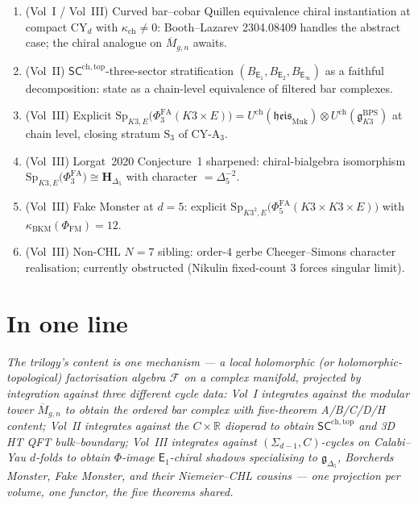 \documentclass[11pt]{article}
\theoremstyle{definition}
\theoremstyle{remark}
\providecommand{\R}{\mathbb{R}}
\providecommand{\cF}{\mathcal{F}}
\providecommand{\fg}{\mathfrak{g}}
\providecommand{\fheis}{\mathfrak{heis}}
\providecommand{\Sp}{\mathrm{Sp}}
\providecommand{\Phifa}{\Phi^{\mathrm{FA}}}
\providecommand{\Eone}{\mathsf{E}_1}
\providecommand{\Etwo}{\mathsf{E}_2}
\providecommand{\Einf}{\mathsf{E}_\infty}
\providecommand{\kch}{\kappa_{\mathrm{ch}}}
\providecommand{\kBKM}{\kappa_{\mathrm{BKM}}}
\begin{document}
\begin{enumerate}[leftmargin=1.5em]
\item (Vol~I / Vol~III) Curved bar--cobar Quillen equivalence
chiral instantiation at compact CY$_d$ with $\kch\neq 0$:
Booth--Lazarev 2304.08409 handles the abstract case; the chiral
analogue on $\overline{M}_{g,n}$ awaits.
\item (Vol~II) $\mathsf{SC}^{\mathrm{ch,top}}$-three-sector
stratification $(B_{\Eone}, B_{\Etwo}, B_{\Einf})$ as a faithful
decomposition: state as a chain-level equivalence of filtered bar
complexes.
\item (Vol~III) Explicit
$\Sp_{K3,E}\bigl(\Phifa_3(K3\times E)\bigr) =
U^{\mathrm{ch}}(\fheis_{\mathrm{Muk}})\otimes
U^{\mathrm{ch}}(\fg^{\mathrm{BPS}}_{K3})$ at chain level, closing
stratum $\mathrm{S}_3$ of CY-A$_3$.
\item (Vol~III) Lorgat~2020 Conjecture~1 sharpened: chiral-bialgebra
isomorphism $\Sp_{K3,E}\bigl(\Phifa_3\bigr)\cong
\mathbf{H}_{\Delta_5}$ with character $= \Delta_5^{-2}$.
\item (Vol~III) Fake Monster at $d = 5$: explicit
$\Sp_{K3^2,E}\bigl(\Phifa_5(K3\times K3\times E)\bigr)$
with $\kBKM(\Phi_{\mathrm{FM}}) = 12$.
\item (Vol~III) Non-CHL $N = 7$ sibling: order-$4$ gerbe
Cheeger--Simons character realisation; currently obstructed
(Nikulin fixed-count $3$ forces singular limit).
\end{enumerate}

\section{In one line}

\emph{The trilogy's content is one mechanism --- a local holomorphic
(or holomorphic-topological) factorisation algebra $\cF$ on a
complex manifold, projected by integration against three different
cycle data: Vol~I integrates against the modular tower
$\overline{M}_{g,n}$ to obtain the ordered bar complex with five-theorem
A/B/C/D/H content; Vol~II integrates against the $C\times\R$ dioperad
to obtain $\mathsf{SC}^{\mathrm{ch,top}}$ and 3D HT QFT bulk--boundary;
Vol~III integrates against $(\Sigma_{d-1},C)$-cycles on Calabi--Yau
$d$-folds to obtain $\Phi$-image $\Eone$-chiral shadows
specialising to $\fg_{\Delta_5}$, Borcherds Monster, Fake Monster,
and their Niemeier--CHL cousins --- one projection per volume, one
functor, the five theorems shared.}
\end{document}
